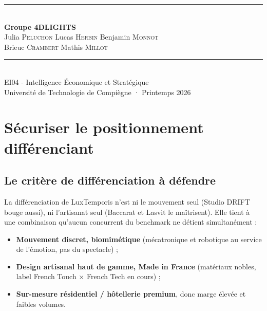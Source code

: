 \documentclass[11pt,a4paper]{article}
\begin{document}
\vfill

\begin{center}
  \rule{0.5\linewidth}{0.4pt}\\[1.0em]
  {\normalsize\bfseries Groupe 4DLIGHTS}\\[0.6em]
  {\normalsize
    Julia \textsc{Peluchon} \quad\textbullet\quad
    Lucas \textsc{Herbin} \quad\textbullet\quad
    Benjamin \textsc{Monnot}\\[0.3em]
    Brieuc \textsc{Crambert} \quad\textbullet\quad
    Mathis \textsc{Millot}
  }\\[1.0em]
  \rule{0.5\linewidth}{0.4pt}\\[0.6em]
  {\small EI04 - Intelligence Économique et Stratégique}\\[0.2em]
  {\small Université de Technologie de Compiègne · Printemps 2026}
\end{center}

\newpage

\tableofcontents
\newpage

\section{Sécuriser le positionnement différenciant}

\subsection{Le critère de différenciation à défendre}

La différenciation de LuxTemporis n'est ni le mouvement seul (Studio DRIFT bouge aussi), ni l'artisanat seul (Baccarat et Lasvit le maîtrisent). Elle tient à une combinaison qu'aucun concurrent du benchmark ne détient simultanément :

\begin{itemize}
  \item \textbf{Mouvement discret, biomimétique} (mécatronique et robotique au service de l'émotion, pas du spectacle) ;
  \item \textbf{Design artisanal haut de gamme, Made in France} (matériaux nobles, label French Touch × French Tech en cours) ;
  \item \textbf{Sur-mesure résidentiel / hôtellerie premium}, donc marge élevée et faibles volumes.
\end{itemize}
\end{document}
